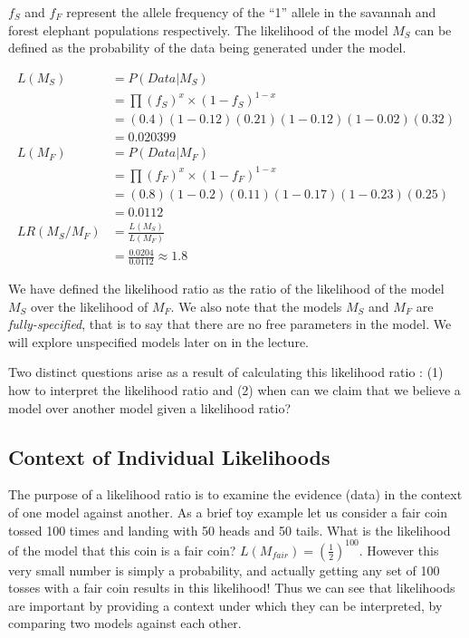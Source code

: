 \documentclass[12pt]{report}
\begin{document}
$f_S$ and $f_F$ represent the allele frequency of the ``1'' allele in the savannah and forest elephant populations respectively. The likelihood of the model $M_S$ can be defined as the probability of the data being generated under the model. 

\begin{align*}
	L(M_S) &= P(Data | M_S)\\
	&= \prod (f_S)^x\times(1-f_S)^{1-x}\\
	&= (0.4)(1-0.12)(0.21)(1-0.12)(1-0.02)(0.32)\\
	&= 0.020399\\
	L(M_F) &= P(Data | M_F)\\
	&= \prod (f_F)^x\times(1-f_F)^{1-x}\\
	&= (0.8)(1-0.2)(0.11)(1-0.17)(1-0.23)(0.25)\\
	&= 0.0112\\
	LR(M_S/M_F) &= \frac{L(M_S)}{L(M_F)}\\
	&= \frac{0.0204}{0.0112} \approx 1.8
\end{align*}

We have defined the likelihood ratio as the ratio of the likelihood of the model $M_S$ over the likelihood of $M_F$. We also note that the models $M_S$ and $M_F$ are \textit{fully-specified}, that is to say that there are no free parameters in the model. We will explore unspecified models later on in the lecture.

Two distinct questions arise as a result of calculating this likelihood ratio : (1) how to interpret the likelihood ratio and (2) when can we claim that we believe a model over another model given a likelihood ratio?

\subsection{Context of Individual Likelihoods}

The purpose of a likelihood ratio is to examine the evidence (data) in the context of one model against another. As a brief toy example let us consider a fair coin tossed 100 times and landing with 50 heads and 50 tails. What is the likelihood of the model that this coin is a fair coin? $L(M_{fair}) = \left(\frac{1}{2}\right)^{100}$. However this very small number is simply a probability, and actually getting any set of 100 tosses with a fair coin results in this likelihood! Thus we can see that likelihoods are important by providing a context under which they can be interpreted, by comparing two models against each other.  
\end{document}
